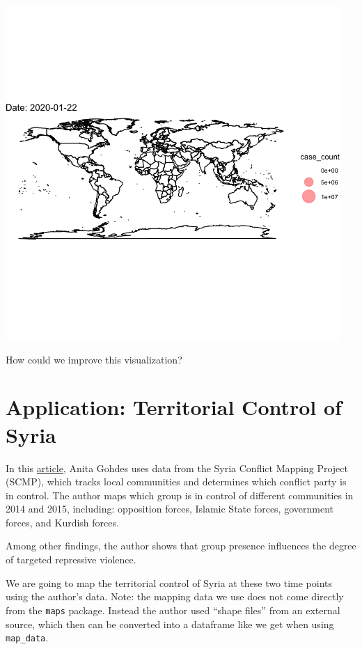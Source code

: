 \documentclass[
  letterpaper,
  DIV=11,
  numbers=noendperiod]{scrreprt}
\begin{document}
\includegraphics{images/covidplot.gif}

How could we improve this visualization?

\hypertarget{application-territorial-control-of-syria}{%
\section{Application: Territorial Control of
Syria}\label{application-territorial-control-of-syria}}

In this
\href{https://onlinelibrary.wiley.com/doi/abs/10.1111/ajps.12509}{article},
Anita Gohdes uses data from the Syria Conflict Mapping Project (SCMP),
which tracks local communities and determines which conflict party is in
control. The author maps which group is in control of different
communities in 2014 and 2015, including: opposition forces, Islamic
State forces, government forces, and Kurdish forces.

Among other findings, the author shows that group presence influences
the degree of targeted repressive violence.

We are going to map the territorial control of Syria at these two time
points using the author's data. Note: the mapping data we use does not
come directly from the \texttt{maps} package. Instead the author used
``shape files'' from an external source, which then can be converted
into a dataframe like we get when using \texttt{map\_data}.
\end{document}

